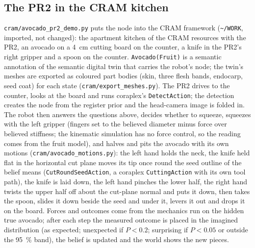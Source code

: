 \documentclass[10.5pt,a4paper]{article}
\begin{document}
\subsection{The PR2 in the CRAM kitchen}\label{sec:pr2}
\texttt{cram/avocado\_pr2\_demo.py} puts the node into the CRAM framework (\texttt{\textasciitilde/WORK}, imported, not
changed): the apartment kitchen of the CRAM resources with the PR2, an avocado on a 4~cm cutting board on the
counter, a knife in the PR2's right gripper and a spoon on the counter. \texttt{Avocado(Fruit)} is a semantic
annotation of the semantic digital twin that carries the robot's node; the twin's meshes are exported as coloured
part bodies (skin, three flesh bands, endocarp, seed coat) for each state (\texttt{cram/export\_meshes.py}).
The PR2 drives to the counter, looks at the board and runs coraplex's \texttt{DetectAction}; the detection creates the
node from the register prior and the head-camera image is folded in. The robot then answers the questions above,
decides whether to squeeze, squeezes with the left gripper (fingers set to the believed diameter minus force over
believed stiffness; the kinematic simulation has no force control, so the reading comes from the fruit model), and
halves and pits the avocado with its own motions (\texttt{cram/avocado\_motions.py}): the left hand holds the neck,
the knife held flat in the horizontal cut plane moves its tip once round the seed outline of the belief means
(\texttt{CutRoundSeedAction}, a coraplex \texttt{CuttingAction} with its own tool path), the knife is laid down, the
left hand pinches the lower half, the right hand twists the upper half off about the cut-plane normal and puts it
down, then takes the spoon, slides it down beside the seed and under it, levers it out and drops it on the board.
Forces and outcomes come from the mechanics run on the hidden true avocado; after each step the measured outcome is
placed in the imagined distribution (as expected; unexpected if $P<0.2$; surprising if $P<0.05$ or outside the
95~\% band), the belief is updated and the world shows the new pieces.
\end{document}
